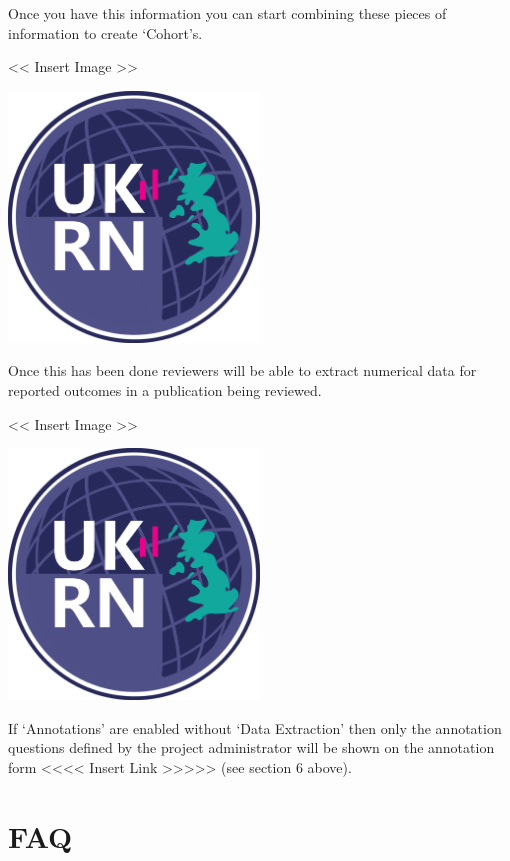 \documentclass[
]{book}
\begin{document}
Once you have this information you can start combining these pieces of information to create `Cohort's.

\textless{}\textless{} Insert Image \textgreater{}\textgreater{}

\includegraphics[width=0.5\textwidth,height=0.5\textheight]{figs/evidence-triangle.png}

Once this has been done reviewers will be able to extract numerical data for reported outcomes in a publication being reviewed.

\textless{}\textless{} Insert Image \textgreater{}\textgreater{}

\includegraphics[width=0.5\textwidth,height=0.5\textheight]{figs/evidence-triangle.png}

If `Annotations' are enabled without `Data Extraction' then only the annotation questions defined by the project administrator will be shown on the annotation form
\textless{}\textless{}\textless{}\textless{} Insert Link \textgreater{}\textgreater{}\textgreater{}\textgreater{}\textgreater{}
(see section 6 above).

\hypertarget{faq}{%
\chapter{FAQ}\label{faq}}
\end{document}
